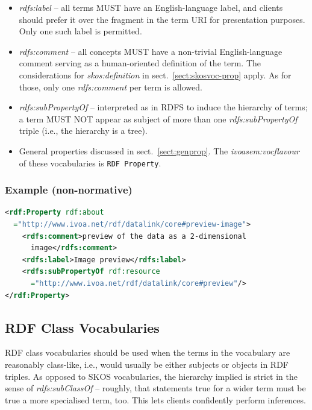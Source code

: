 \documentclass[11pt,a4paper]{ivoa}
\newcommand{\vocterm}[1]{\emph{\color{termcolor}#1}}
\begin{document}
\begin{itemize}
\item \vocterm{rdfs:label} -- all terms MUST have an English-language
label, and clients should prefer it over the fragment in the
term URI for presentation purposes.  Only
one such label is permitted.

\item \vocterm{rdfs:comment} -- all concepts MUST have a non-trivial
English-language comment serving as a human-oriented definition of the
term.  The considerations for \vocterm{skos:definition} in
sect.~\ref{sect:skosvoc-prop} apply.  As for those, only one
\vocterm{rdfs:comment} per term is allowed.

\item \vocterm{rdfs:subPropertyOf} -- interpreted as in RDFS to induce
the hierarchy of terms; a term MUST NOT appear as subject of more than
one \vocterm{rdfs:subPropertyOf} triple (i.e., the hierarchy is a tree).

\item General properties discussed in sect.~\ref{sect:genprop}.  
The \vocterm{ivoasem:vocflavour} of these vocabularies is 
\verb|RDF Property|.

\end{itemize}

\subsubsection{Example (non-normative)}
\label{sect:rdfpxex}

\begin{lstlisting}[language=XML]
<rdf:Property rdf:about
  ="http://www.ivoa.net/rdf/datalink/core#preview-image">
    <rdfs:comment>preview of the data as a 2-dimensional 
      image</rdfs:comment>
    <rdfs:label>Image preview</rdfs:label>
    <rdfs:subPropertyOf rdf:resource
      ="http://www.ivoa.net/rdf/datalink/core#preview"/>
</rdf:Property>
\end{lstlisting}


\subsection{RDF Class Vocabularies}

RDF class vocabularies should be used when the terms in the vocabulary
are reasonably class-like, i.e., would usually be either subjects or
objects in RDF triples.  As opposed to SKOS vocabularies, the hierarchy
implied is strict in the sense of \vocterm{rdfs:subClassOf}
-- roughly, that statements true for a wider term must be true
a more specialised term, too.  This lets clients confidently perform
inferences.
\end{document}
